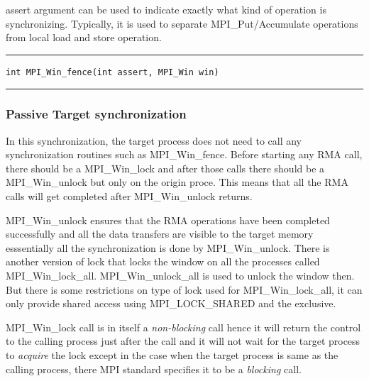 {\ttfamily assert} argument can be used to indicate exactly what kind of operation  is synchronizing. Typically, it is used to separate {\ttfamily MPI\_Put/Accumulate} operations from local load and store operation. \vspace{10pt}
\hrule \vspace{-8pt}
\begin{verbatim}
int MPI_Win_fence(int assert, MPI_Win win)        
\end{verbatim}
\vspace{-8pt}
\hrule

\subsubsection{\large Passive Target synchronization}
In this synchronization, the target process does not need to call any synchronization routines such as {\ttfamily MPI\_Win\_fence}. Before starting any RMA call, there should be a {\ttfamily MPI\_Win\_lock} and after those calls there should be a {\ttfamily MPI\_Win\_unlock} but only on the origin proce. This means that all the RMA calls will get completed after {\ttfamily MPI\_Win\_unlock} returns.

{\ttfamily MPI\_Win\_unlock} ensures that the RMA operations have been completed successfully and all the data transfers are visible to the target memory esssentially all the synchronization is done by {\ttfamily MPI\_Win\_unlock}. There is another version of lock that locks the window on all the processes called {\ttfamily MPI\_Win\_lock\_all}. {\ttfamily MPI\_Win\_unlock\_all} is used to unlock the window then. But there is some restrictions on type of lock used for {\ttfamily MPI\_Win\_lock\_all}, it can only provide shared access using {\ttfamily MPI\_LOCK\_SHARED} and the exclusive.

{\ttfamily MPI\_Win\_lock} call is in itself a {\em non-blocking} call hence it will return the control to the calling process just after the call and it will not wait for the target process to {\em acquire} the lock except in the case when the target process is same as the calling process, there MPI standard specifies it to be a {\em blocking} call. 

